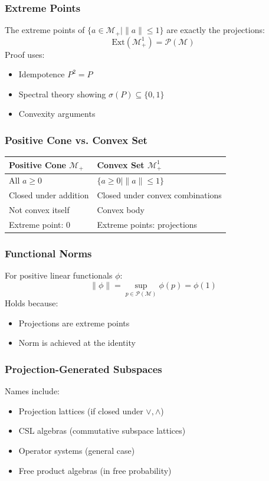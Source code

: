 \documentclass{article}
\begin{document}
\subsubsection*{Extreme Points}

The extreme points of $\{a \in \mathcal{M}_+ \mid \|a\| \leq 1\} $ are
exactly the projections: 
\begin{equation*}
\text{Ext}(\mathcal{M}_+^1) = \mathcal{P}(\mathcal{M}) 
\end{equation*}
Proof uses:

\begin{itemize}
\item Idempotence $P^2 = P $

\item Spectral theory showing $\sigma(P) \subseteq \{0,1\} $

\item Convexity arguments
\end{itemize}

\subsubsection*{Positive Cone vs. Convex Set}

\begin{tabular}{|l|l|}
\hline
\textbf{Positive Cone} $\mathcal{M}_+ $ & \textbf{Convex Set} $\mathcal{M}%
_+^1 $ \\ \hline
All $a \geq 0 $ & $\{a \geq 0 \mid \|a\| \leq 1\} $ \\ 
Closed under addition & Closed under convex combinations \\ 
Not convex itself & Convex body \\ 
Extreme point: 0 & Extreme points: projections \\ \hline
\end{tabular}

\subsubsection*{Functional Norms}

For positive linear functionals $\phi $: 
\begin{equation*}
\|\phi\| = \sup_{p \in \mathcal{P}(\mathcal{M})} \phi(p) = \phi(1) 
\end{equation*}
Holds because:

\begin{itemize}
\item Projections are extreme points

\item Norm is achieved at the identity
\end{itemize}

\subsubsection*{Projection-Generated Subspaces}

Names include:

\begin{itemize}
\item Projection lattices (if closed under $\vee, \wedge $)

\item CSL algebras (commutative subspace lattices)

\item Operator systems (general case)

\item Free product algebras (in free probability)
\end{itemize}
\end{document}
